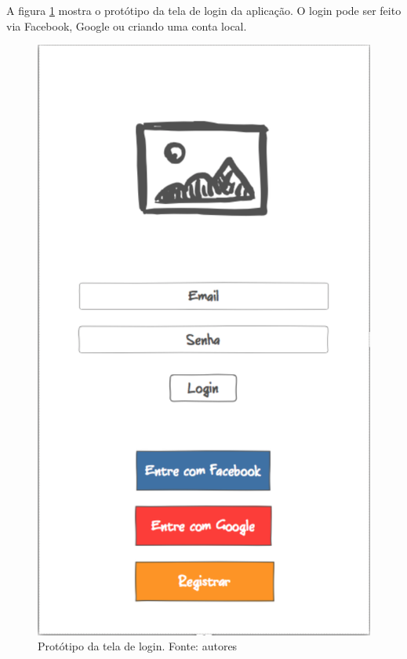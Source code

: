 A figura \ref{img:prototipo_tela_de_login} mostra o protótipo da tela de login da aplicação. O login pode ser feito via Facebook, Google ou criando uma conta local.
\begin{figure}[H]
    \centering
    \includegraphics[scale=0.5]{figuras/prototipo_login.png}
    \caption[Protótipo da tela de login]{Protótipo da tela de login. Fonte: autores}
    \label{img:prototipo_tela_de_login}
\end{figure}
 \pagebreak

